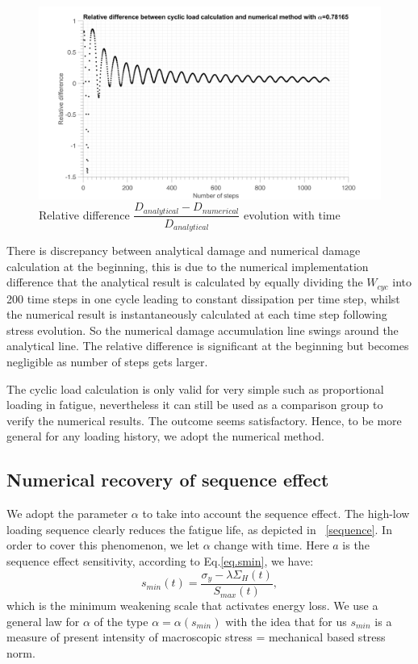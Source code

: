 \documentclass[3p,times,number,review]{elsarticle}
\newcommand{\figref}[1]{\figurename~\ref{#1}}
\begin{document}
\begin{figure}[!h]
	\centering
	\includegraphics[width=\textwidth]{figures//Damagediff.png} 
	\caption{Relative difference $\dfrac{D_{analytical}-D_{numerical}}{D_{analytical}}$ evolution with time}
	\label{Damagediff}
\end{figure}

There is discrepancy between analytical damage and numerical damage calculation at the beginning, this is due to the numerical implementation difference that the analytical result is calculated by equally dividing the $W_{cyc}$ into 200 time steps in one cycle leading to constant dissipation per time step, whilst the numerical result is instantaneously calculated at each time step following stress evolution. So the numerical damage accumulation line swings around the analytical line. The relative difference is significant at the beginning but becomes negligible as number of steps gets larger.

The cyclic load calculation is only valid for very simple such as proportional loading in fatigue, nevertheless it can still be used as a comparison group to verify the numerical results. The outcome seems satisfactory. Hence, to be more general for any loading history, we adopt the numerical method.

\newpage
\subsection{Numerical recovery of sequence effect}
We adopt the parameter $\alpha$ to take into account the sequence effect. The high-low loading sequence clearly reduces the fatigue life, as depicted in \figref{sequence}. In order to cover this phenomenon, we let $\alpha$ change with time. Here $a$ is the sequence effect sensitivity, according to Eq.\eqref{eq.smin}, we have:
$$s_{min}(t)=\dfrac{\sigma_y-\lambda \Sigma_H(t)}{S_{max}(t)},$$
which is the minimum weakening scale that activates energy loss.  We use a general law for $\alpha$ of the type $\alpha = \alpha (s_{min})$ with the idea that for us $s_{min}$ is a measure of present intensity of macroscopic stress = mechanical based stress norm. 
\end{document}
